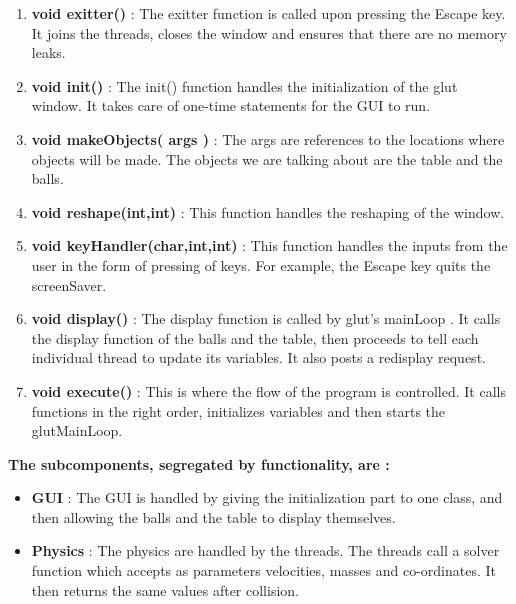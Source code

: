 \documentclass[]{article}
\begin{document}
\begin{itemize}
\begin{flushleft}
\begin{enumerate}
\item \textbf{void exitter()} : The exitter function is called upon pressing the Escape key. It joins the threads, closes the window and ensures that there are no memory leaks.

\item \textbf{void init()} : The init() function handles the initialization of the glut window. It takes care of one-time statements for the GUI to run.

\item \textbf{void makeObjects( args )} : The args are references to the locations where objects will be made. The objects we are talking about are the table and the balls. 

\item \textbf{void reshape(int,int)} : This function handles the reshaping of the window.

\item \textbf{void keyHandler(char,int,int)} : This function handles the inputs from the user in the form of pressing of keys. For example, the Escape key quits the screenSaver.

\item \textbf{void display()} : The display function is called by glut's mainLoop . It calls the display function of the balls and the table, then proceeds to tell each individual thread to update its variables. It also posts a redisplay request.

\item \textbf{void execute()} : This is where the flow of the program is controlled. It calls functions in the right order, initializes variables and then starts the glutMainLoop.

\end{enumerate}


\textbf{The subcomponents, segregated by functionality, are :}

\begin{itemize}

\item \textbf{GUI} : The GUI is handled by giving the initialization part to one class, and then allowing the balls and the table to display themselves.

\item \textbf{Physics} : The physics are handled by the threads. The threads call a solver function which accepts as parameters velocities, masses and co-ordinates. It then returns the same values after collision.


\end{itemize}
\end{flushleft}
\end{itemize}
\end{document}
